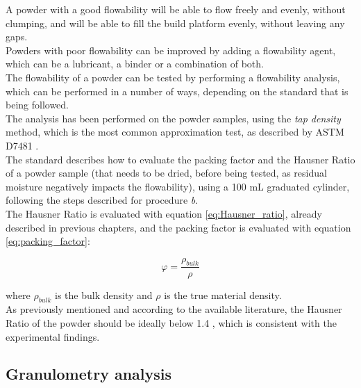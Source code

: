 \documentclass{article}
\begin{document}
        A powder with a good flowability will be able to flow freely and evenly, without clumping, and will be able to fill the 
        build platform evenly, without leaving any gaps. \\ 

        Powders with poor flowability can be improved by adding a flowability agent, which can be a lubricant, a binder or a 
        combination of both. \\ 

        The flowability of a powder can be tested by performing a flowability analysis, which can be performed in a number of ways, 
        depending on the standard that is being followed. \\

        The analysis has been performed on the powder samples, using the \textit{tap density} method, which is the most common 
        approximation test, as described by ASTM D7481 \autocites{ASTM_D7481-18}. \\

        The standard describes how to evaluate the packing factor and the Hausner Ratio of a powder sample (that needs to be 
        dried, before being tested, as residual moisture negatively impacts the flowability), 
        using a 100 mL graduated cylinder, following the steps described for procedure \textit{b}. \\

        The Hausner Ratio is evaluated with equation \ref{eq:Hausner_ratio}, already described in previous chapters, 
        and the packing factor is evaluated with equation \ref{eq:packing_factor}: 

            \begin{equation}
                \varphi  = \frac{\rho_{bulk}}{\rho}
                \label{eq:packing_factor}
            \end{equation}

        where $\rho_{bulk}$ is the bulk density and $\rho$ is the true material density. \\

        As previously mentioned and according to the available literature, the Hausner Ratio of the powder should 
        be ideally below 1.4 \autocites{doi:10.1063/1.4918516}, which is consistent with the experimental findings. \\  

        \clearpage

        \subsection{Granulometry analysis\label{granulometry_analysis}}
\end{document}
